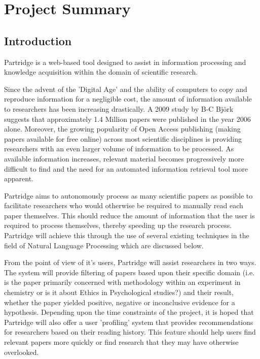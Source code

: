 \documentclass[12pt,a4paper]{article}
\begin{document}



\setlength{\parindent}{0pt}
\setlength{\parskip}{1.5ex plus 0.5ex minus 0.2ex}

\tableofcontents

\pagebreak

\section{Project Summary}

\subsection{Introduction}
Partridge is a web-based tool designed to assist in information processing and knowledge
acquisition within the domain of scientific research.

Since the advent of the 'Digital Age' and the ability of computers to copy and
reproduce information for a negligible cost, the amount of information
available to researchers has been increasing drastically.  A 2009 study by B-C
Bj\"{o}rk suggests that approximately 1.4 Million papers were published in the
year 2006 alone\cite{bjork2009}. Moreover, the growing popularity of Open Access
publishing (making papers available for free online\cite{Suber2012}) across
most scientific disciplines\cite{bjork2009}\cite{harnad2004comparing} is
providing researchers with an even larger volume of information to be
processed. As available information increases, relevant material becomes
progressively more difficult to find and the need for an automated information
retrieval tool more apparent.

Partridge aims to autonomously process as many scientific papers as possible to
facilitate researchers who would otherwise be required to manually read each
paper themselves. This should reduce the amount of information that the user is
required to process themselves, thereby speeding up the research process.
Partridge will achieve this through the use of several existing techniques in
the field of Natural Language Processing which are discussed below.

From the point of view of it's users, Partridge will assist researchers in two
ways. The system will provide filtering of papers based upon their
specific domain (i.e. is the paper primarily concerned with methodology within
an experiment in chemistry or is it about Ethics in Psychological studies?) and
their result, whether the paper yielded positive, negative or inconclusive
evidence for a hypothesis. Depending upon the time constraints of the
project, it is hoped that Partridge will also offer a user 'profiling' system
that provides recommendations for researchers based on their reading history.
This feature should help users find relevant papers more quickly or find research that
they may have otherwise overlooked.
\end{document}
